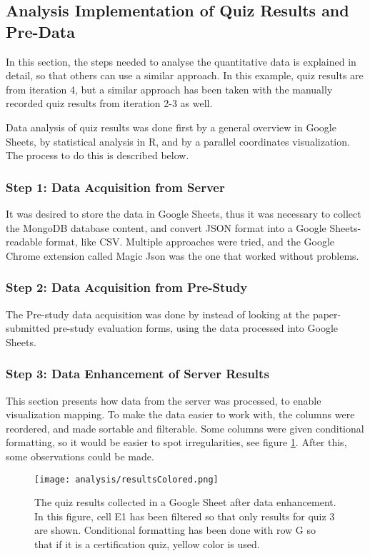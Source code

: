 \subsection{Analysis Implementation of Quiz Results and Pre-Data}

In this section, the steps needed to analyse the quantitative data is explained in detail, so that others can use a similar approach. In this example, quiz results are from iteration 4, but a similar approach has been taken with the manually recorded quiz results from iteration 2-3 as well.

Data analysis of quiz results was done first by a general overview in Google Sheets, by statistical analysis in R, and by a parallel coordinates visualization. The process to do this is described below.

\subsubsection{Step 1: Data Acquisition from Server}

It was desired to store the data in Google Sheets, thus it was necessary to collect the MongoDB database content, and convert JSON format into a Google Sheets-readable format, like CSV. Multiple approaches were tried, and the Google Chrome extension called Magic Json \citep{agaze} was the one that worked without problems.

\subsubsection{Step 2: Data Acquisition from Pre-Study}

The Pre-study data acquisition was done by instead of looking at the paper-submitted pre-study evaluation forms, using the data processed into Google Sheets.

\subsubsection{Step 3: Data Enhancement of Server Results}

This section presents how data from the server was processed, to enable visualization mapping. To make the data easier to work with, the columns were reordered, and made sortable and filterable. Some columns were given conditional formatting, so it would be easier to spot irregularities, see figure \ref{fig:resultsColored}. After this, some observations could be made.

\begin{figure}[h]
    \centering
    \texttt{[image: analysis/resultsColored.png]}
    \caption{The quiz results collected in a Google Sheet after data enhancement. In this figure, cell E1 has been filtered so that only results for quiz 3 are shown. Conditional formatting has been done with row G so that if it is a certification quiz, yellow color is used.}
    \label{fig:resultsColored}
\end{figure}

